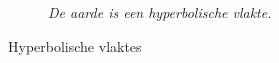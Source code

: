 \documentclass{article}
\begin{document}
\begin{figure}[h]
\begin{subfigure}{0.6\textwidth}
            \caption{\textit{De aarde is een hyperbolische vlakte.}}
			\label{fig:aarde}
        \end{subfigure}%
        \caption{Hyperbolische vlaktes}
        \label{fig:structCompare}
\end{figure}
\end{document}
